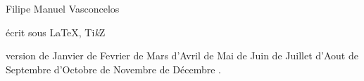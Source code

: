 \vspace*{1cm}
\mbox{}\hfill{}

{\vspace*{3cm}\centerline{\Huge Filipe Manuel Vasconcelos}}

{\small\hbox{}\vfill
\hfill écrit sous \LaTeX, Ti\emph{k}Z

\renewcommand{\today}{\ifcase\month\or de Janvier \or de Fevrier \or de Mars
                                   \or d'Avril   \or de Mai     \or de Juin
                                   \or de Juillet \or d'Aout \or de Septembre
                                   \or d'Octobre \or de Novembre \or 
                                       de Décembre \fi \number \year}
\hfill version \today.

\hfill \doclicenseLongText

\hfill \doclicenseImage[imagewidth=10em]
}
